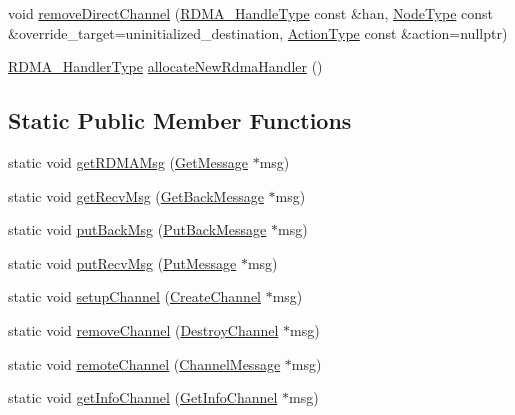 \begin{DoxyCompactItemize}
\item 
void \hyperlink{structvt_1_1rdma_1_1_r_d_m_a_manager_a9767f9beafd9a352ae2b9f0a189f7346}{remove\+Direct\+Channel} (\hyperlink{namespacevt_a10442579ec4e7ebef223818e64bcf908}{R\+D\+M\+A\+\_\+\+Handle\+Type} const \&han, \hyperlink{namespacevt_a866da9d0efc19c0a1ce79e9e492f47e2}{Node\+Type} const \&override\+\_\+target=uninitialized\+\_\+destination, \hyperlink{namespacevt_ae0a5a7b18cc99d7b732cb4d44f46b0f3}{Action\+Type} const \&action=nullptr)
\item 
\hyperlink{namespacevt_a9530efb893c0f3846e8ac5f0507e0f49}{R\+D\+M\+A\+\_\+\+Handler\+Type} \hyperlink{structvt_1_1rdma_1_1_r_d_m_a_manager_a9b393c6dbd360c0b7bfb899e3fc0451b}{allocate\+New\+Rdma\+Handler} ()
\end{DoxyCompactItemize}
\subsection*{Static Public Member Functions}
\begin{DoxyCompactItemize}
\item 
static void \hyperlink{structvt_1_1rdma_1_1_r_d_m_a_manager_aba5002562451e1264979003dcf1e659e}{get\+R\+D\+M\+A\+Msg} (\hyperlink{namespacevt_1_1rdma_acce0da4c9ea1233c3f132c1971943653}{Get\+Message} $\ast$msg)
\item 
static void \hyperlink{structvt_1_1rdma_1_1_r_d_m_a_manager_a1c11e7b5616c22d03fd3884f99d3e7ff}{get\+Recv\+Msg} (\hyperlink{namespacevt_1_1rdma_a72a94b92eba75ec9fec43b2a9a4ad878}{Get\+Back\+Message} $\ast$msg)
\item 
static void \hyperlink{structvt_1_1rdma_1_1_r_d_m_a_manager_ad8525c38d7d47c1e96a6ed4399e5b1ef}{put\+Back\+Msg} (\hyperlink{namespacevt_1_1rdma_a07a52401fe8185d190371b3333dc61ac}{Put\+Back\+Message} $\ast$msg)
\item 
static void \hyperlink{structvt_1_1rdma_1_1_r_d_m_a_manager_a87d44e05aeeb404290ac2a38b4631fe0}{put\+Recv\+Msg} (\hyperlink{namespacevt_1_1rdma_ae0a0330c647ec5ac5d508750f4cd4a06}{Put\+Message} $\ast$msg)
\item 
static void \hyperlink{structvt_1_1rdma_1_1_r_d_m_a_manager_a5189682bba9e4b73faa010bf78f96469}{setup\+Channel} (\hyperlink{structvt_1_1rdma_1_1_create_channel}{Create\+Channel} $\ast$msg)
\item 
static void \hyperlink{structvt_1_1rdma_1_1_r_d_m_a_manager_a240f9f8c6697b4fc94c8a8b1b4d6c737}{remove\+Channel} (\hyperlink{namespacevt_1_1rdma_a1273aeddd73c1ffac0d7383ef7a314d8}{Destroy\+Channel} $\ast$msg)
\item 
static void \hyperlink{structvt_1_1rdma_1_1_r_d_m_a_manager_a8c2cb5f8770dfe6265065c6040314399}{remote\+Channel} (\hyperlink{structvt_1_1rdma_1_1_channel_message}{Channel\+Message} $\ast$msg)
\item 
static void \hyperlink{structvt_1_1rdma_1_1_r_d_m_a_manager_a7e01a11f17c52dee2d564341866e2e29}{get\+Info\+Channel} (\hyperlink{structvt_1_1rdma_1_1_get_info_channel}{Get\+Info\+Channel} $\ast$msg)
\end{DoxyCompactItemize}
